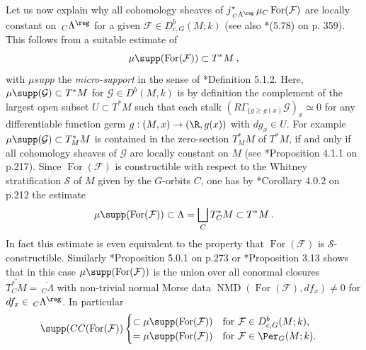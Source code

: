 \documentclass[11pt,letterpaper]{amsart}
\numberwithin{equation}{section}
\begin{document}
Let us now explain why all cohomology sheaves of $j^*_{\,_C\Lambda^\reg}\,\mu_C\operatorname{For}(\mathcal{F})$ are locally constant on $\,_C\Lambda^\reg$ for a given
 $\mathcal{F}\in D^b_{c,G}(M;k)$ (see also \cite{Sch03}*{(5.78) on p. 359}).
 This follows from a suitable estimate of 
 $$\mu\supp(\operatorname{For}(\mathcal{F}))\subset T^*M\:,$$
with $\mu supp$ the {\it micro-support} in the sense of \cite{KaS94}*{Definition 5.1.2}.
Here, $\mu\supp(\mathcal{G})\subset T^*M$ for $\mathcal{G}\in D^b(M,k)$ is by definition the complement of the largest open subset $U\subset T^*M$ such that each stalk $(R\Gamma_{\{g\geq g(x)}\mathcal{G})_x\simeq 0$
 for any differentiable function germ $g : (M,x) \to (\R,g(x))$ 
 with $dg_x \in U$. For example $\mu\supp(\mathcal{G})\subset T^*_MM$ is contained in the zero-section $T^*_MM$ of $T^*M$, if and only if all
 cohomology sheaves of $\mathcal{G}$ are locally constant on $M$ (see \cite{Sch03}*{Proposition 4.1.1 on p.217}).
 Since $\operatorname{For}(\mathcal{F})$ is constructible with respect to the Whitney stratification 
$\mathscr{S}$ of $M$ given by the $G$-orbits $C$, one has by \cite{Sch03}*{Corollary 4.0.2 on p.212} the estimate
\begin{equation}\label{musupp1}
   \mu\supp(\operatorname{For}(\mathcal{F}))\subset \Lambda=  \bigsqcup_{C} T^*_{C}M \subset  T^*M\:. 
\end{equation}
In fact this estimate is even equivalent to the  property that $\operatorname{For}(\mathcal{F})$ is $\mathscr{S}$-constructible. Similarly \cite{Sch03}*{Proposition 5.0.1 on p.273} or \cite{MS22}*{Proposition 3.13} shows that in this case 
$\mu\supp(\operatorname{For}(\mathcal{F}))$ is the union over all conormal closures $\overline{T^*_CM}=\overline{\,_C\Lambda}$ with
non-trivial normal Morse data $\operatorname{NMD}(\operatorname{For}(\mathcal{F}),df_x)\neq 0$ for $df_x\in \,_C\Lambda^\reg$. In particular
\begin{equation}\label{CC-essimate}
 \supp(CC(\operatorname{For}(\mathcal{F})) \begin{cases} \subset \mu\supp(\operatorname{For}(\mathcal{F}))
  \quad \text{for $\mathcal{F}\in D^b_{c,G}(M;k)$,}\\
  = \mu\supp(\operatorname{For}(\mathcal{F}))
  \quad \text{for $\mathcal{F}\in \Per_{G}(M;k)$.}
\end{cases}\end{equation}
 
\end{document}
